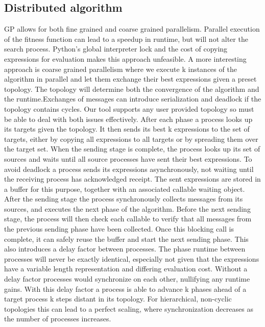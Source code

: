 \subsection{Distributed algorithm}
GP allows for both fine grained and coarse grained parallelism. Parallel execution of the fitness function can lead to a speedup in runtime, but will not alter the search process. Python's global interpreter lock and the cost of copying expressions for evaluation makes this approach unfeasible. A more interesting approach is coarse grained parallelism where we execute k instances of the algorithm in parallel and let them exchange their best expressions given a preset topology. The topology will determine both the convergence of the algorithm and the runtime.Exchanges of messages can introduce serialization and deadlock if the topology contains cycles. Our tool supports any user provided topology so must be able to deal with both issues effectively. 
After each phase a process looks up its targets given the topology. It then sends its best k expressions to the set of targets, either by copying all expressions to all targets or by spreading them over the target set. When the sending stage is complete, the process looks up its set of sources and waits until all source processes have sent their best expressions. To avoid deadlock a process sends its expressions asynchronously, not waiting until the receiving process has acknowledged receipt. The sent expressions are stored in a buffer for this purpose, together with an associated callable waiting object. After the sending stage the process synchronously collects messages from its sources, and executes the next phase of the algorithm. Before the next sending stage, the process will then check each callable to verify that all messages from the previous sending phase have been collected. Once this blocking call is complete, it can safely reuse the buffer and start the next sending phase. This also introduces a delay factor between processes. The phase runtime between processes will never be exactly identical, especially not given that the expressions have a variable length representation and differing evaluation cost. Without a delay factor processes would synchronize on each other, nullifying any runtime gains. With this delay factor a process is able to advance k phases ahead of a target process k steps distant in its topology. 
For hierarchical, non-cyclic topologies this can lead to a perfect scaling, where synchronization decreases as the number of processes increases.
